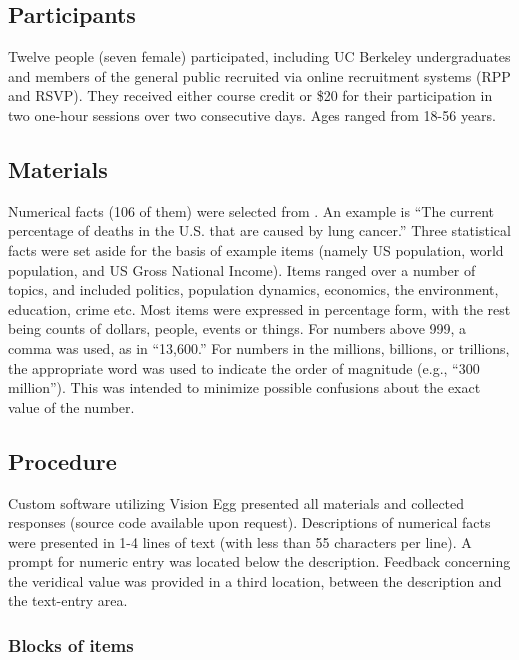 \subsection{Participants}

Twelve people (seven female) participated, including UC Berkeley undergraduates
and members of the general public recruited via online recruitment systems (RPP
and RSVP). They received either course credit or \$20 for their participation in
two one-hour sessions over two consecutive days. Ages ranged from 18-56 years. 

\subsection{Materials}

Numerical facts (106 of them) were selected from \textcite{ranney_designing_2008}
. An example is ``The current percentage of deaths in the U.S. that are
caused by lung cancer.'' Three statistical facts were set aside for the basis of
example items (namely US population, world population, and US Gross National
Income). Items ranged over a number of topics, and included politics, population
dynamics, economics, the environment, education, crime etc. Most items were
expressed in percentage form, with the rest being counts of dollars, people,
events or things. For numbers above 999, a comma was used, as in ``13,600.''  For
numbers in the millions, billions, or trillions, the appropriate word was used
to indicate the order of magnitude (e.g., ``300 million'').  This was intended to
minimize possible confusions about the exact value of the number.

\subsection{Procedure}

Custom software utilizing Vision Egg \parencite{straw_vision_2008} presented all materials and
collected responses (source code available upon request). Descriptions of
numerical facts were presented in 1-4 lines of text (with less than 55
characters per line). A prompt for numeric entry was located below the
description. Feedback concerning the veridical value was provided in a third
location, between the description and the text-entry area.

\subsubsection{Blocks of items}

